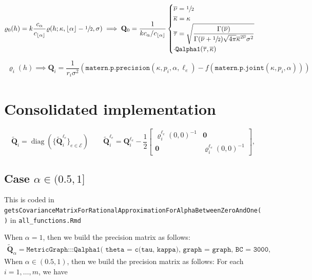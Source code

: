 \documentclass[11pt,a4paper]{article}
\theoremstyle{plain}
\theoremstyle{definition}
\begin{document}
\begin{align}
   \varrho_0(h)= k\dfrac{c_\alpha}{c_{\lfloor\alpha\rfloor}}\varrho(h;\kappa, \lfloor\alpha\rfloor-\sfrac{1}{2}, \sigma)\implies\mathbf{Q}_0 = \dfrac{1}{kc_\alpha/c_{\lfloor\alpha\rfloor}} \begin{cases}
        \overline{\nu} = \sfrac{1}{2}\\
        \overline{\kappa} = \kappa\\
        \overline{\tau} =  \sqrt{\dfrac{\Gamma(\overline{\nu})}{\Gamma(\overline{\nu}+\sfrac{1}{2})\sqrt{4\pi}\overline{\kappa}^{2\overline{\nu}}\sigma^2}}\\
        \cdot\texttt{Qalpha1}(\overline{\tau}, \overline{\kappa})
    \end{cases}
\end{align}
\begin{align}
     \varrho_i(h) \implies \mathbf{Q}_i= \dfrac{1}{r_i\sigma^2}\left(\texttt{matern.p.precision}(\kappa,p_i,\alpha, \ell_e) - f(\texttt{matern.p.joint}(\kappa,p_i,\alpha))\right)
\end{align}

\section{Consolidated implementation}

\begin{equation}
\label{eq:Qedge} \widetilde{\mathbf{Q}}_i = \operatorname{diag}(\{\widetilde{\mathbf{Q}}_i^{\ell_e}\}_{e\in\mathcal{E}})\quad\quad
	\widetilde{\mathbf{Q}}_i^{\ell_e}  = \mathbf{Q}_i^{\ell_e} - \frac{1}{2}\begin{bmatrix}
		\boldsymbol{\varrho}_i^{\ell_e}(0,0)^{-1} & \mathbf{0} \\
		\mathbf{0} & \boldsymbol{\varrho}_i^{\ell_e}(0,0)^{-1} 
	\end{bmatrix},
\end{equation}

\subsection{Case $\alpha\in(0.5,1]$}

This is coded in \texttt{getsCovarianceMatrixForRationalApproximationForAlphaBetweenZeroAndOne()} in \texttt{all\_functions.Rmd}

When $\alpha=1$, then we build the precision matrix as follows:
\begin{align*}
    \widetilde{\mathbf{Q}}_\alpha = \texttt{MetricGraph:::Qalpha1(
      theta = c(tau, kappa),
      graph = graph,
      BC = 3000,
      build = TRUE)}
\end{align*}
When $\alpha\in(0.5,1)$, then we build the precision matrix as follows: For each $i=1,\ldots,m$, we have
\end{document}
